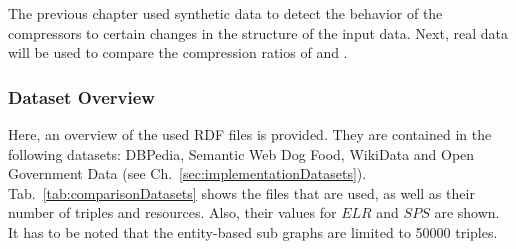 The previous chapter used synthetic data to detect the behavior of the compressors to certain changes in the structure of the input data. Next, real data will be used to compare the compression ratios of \GHDT{} and \GGRP{}. 

\subsubsection{Dataset Overview}

Here, an overview of the used RDF files is provided. They are contained in the following datasets: DBPedia, Semantic Web Dog Food, WikiData and Open Government Data (see Ch.~\ref{sec:implementationDatasets}). Tab.~\ref{tab:comparisonDatasets} shows the files that are used, as well as their number of triples and resources. Also, their values for $ELR$ and $SPS$ are shown. It has to be noted that the entity-based sub graphs are limited to 50000 triples.

